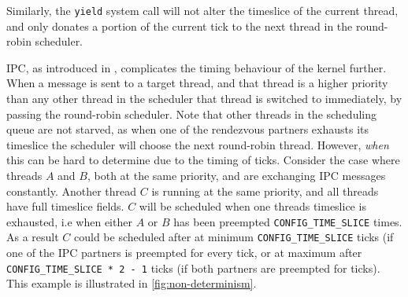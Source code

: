 Similarly, the \texttt{yield} system call will not alter the timeslice of the current thread, and
only donates a portion of the current tick to the next thread in the round-robin scheduler. 

\gls{IPC}, as introduced in , complicates the timing behaviour of the kernel further.
When a message is sent to a target thread, and that thread is a higher priority than any other
thread in the scheduler that thread is switched to immediately, by passing the round-robin scheduler.
Note that other threads in the scheduling queue are not starved, as when one of the rendezvous partners exhausts its timeslice the scheduler will choose the next round-robin thread.
However, \textit{when} this can be hard to determine due to the timing of ticks. 
Consider the case where threads $A$ and $B$, both at the same priority, and are exchanging IPC messages constantly.
Another thread $C$ is running at the same priority, and all threads have full timeslice fields.
$C$ will be scheduled when one threads timeslice is exhausted, i.e when either $A$ or $B$ has been preempted \texttt{CONFIG\_TIME\_SLICE} times.
As a result $C$ could be scheduled after at minimum \texttt{CONFIG\_TIME\_SLICE} ticks (if one of the \gls{IPC} partners is preempted for every tick, or at maximum after \texttt{CONFIG\_TIME\_SLICE * 2 - 1} ticks (if both partners are preempted for ticks).
This example is illustrated in \cref{fig:non-determinism}.

